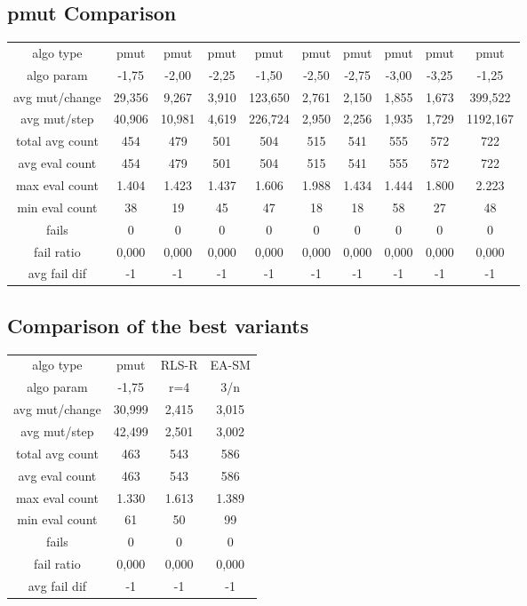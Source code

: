 \subsection{pmut Comparison}
\begin{tabular}[h]{cccccccccc}
algo type&             pmut&      pmut&      pmut&      pmut&      pmut&      pmut&      pmut&      pmut&      pmut\\
algo param&           -1,75&     -2,00&     -2,25&     -1,50&     -2,50&     -2,75&     -3,00&     -3,25&     -1,25\\
avg mut/change&      29,356&     9,267&     3,910&   123,650&     2,761&     2,150&     1,855&     1,673&   399,522\\
avg mut/step&        40,906&    10,981&     4,619&   226,724&     2,950&     2,256&     1,935&     1,729&  1192,167\\
\hline
total avg count&        454&       479&       501&       504&       515&       541&       555&       572&       722\\
avg eval count&         454&       479&       501&       504&       515&       541&       555&       572&       722\\
max eval count&       1.404&     1.423&     1.437&     1.606&     1.988&     1.434&     1.444&     1.800&     2.223\\
min eval count&          38&        19&        45&        47&        18&        18&        58&        27&        48\\
\hline
fails&                    0&         0&         0&         0&         0&         0&         0&         0&         0\\
fail ratio&           0,000&     0,000&     0,000&     0,000&     0,000&     0,000&     0,000&     0,000&     0,000\\
avg fail dif&            -1&        -1&        -1&        -1&        -1&        -1&        -1&        -1&        -1\\
\end{tabular}
\subsection{Comparison of the best variants}
\begin{tabular}[h]{cccc}
algo type&            pmut&    RLS-R&    EA-SM\\
algo param&          -1,75&      r=4&      3/n\\
avg mut/change&     30,999&    2,415&    3,015\\
avg mut/step&       42,499&    2,501&    3,002\\
\hline
total avg count&       463&      543&      586\\
avg eval count&        463&      543&      586\\
max eval count&      1.330&    1.613&    1.389\\
min eval count&         61&       50&       99\\
\hline
fails&                   0&        0&        0\\
fail ratio&          0,000&    0,000&    0,000\\
avg fail dif&           -1&       -1&       -1\\
\end{tabular}
